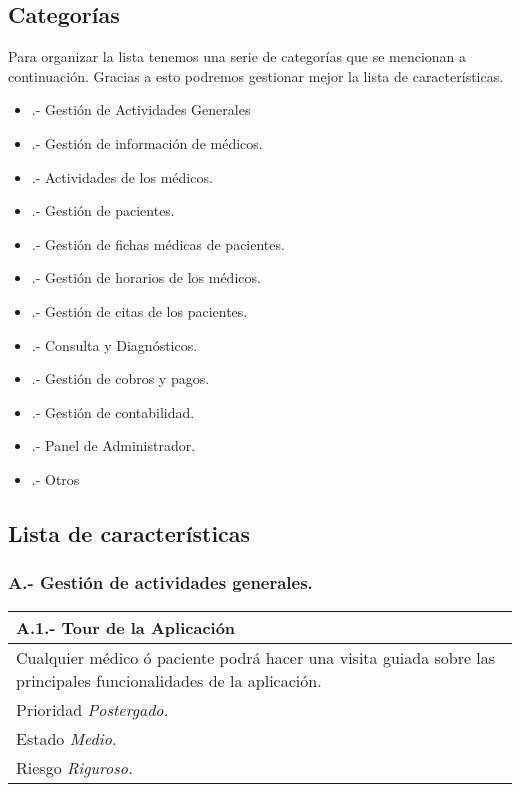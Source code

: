 	\subsection{Categorías}
	Para organizar la lista tenemos una serie de categorías que se mencionan a continuación. Gracias a esto podremos gestionar mejor la lista de características.
	\begin{itemize}
	\item [A].- Gestión de Actividades Generales 
	\item [B].- Gestión de información de médicos.
	\item [C].- Actividades de los médicos.
	\item [D].- Gestión de pacientes.
	\item [E].- Gestión de fichas médicas de pacientes.
	\item [F].- Gestión de horarios de los médicos.
	\item [G].- Gestión de citas de los pacientes.
	\item [H].- Consulta y Diagnósticos.
	\item [I].- Gestión de cobros y pagos.
	\item [J].- Gestión de contabilidad.
	\item [K].- Panel de Administrador.
	\item [L].- Otros
	\end{itemize}

	\subsection{Lista de características}

	\subsubsection{A.- Gestión de actividades generales.}

	\begin{center}
	\begin{tabulary}{15cm}{|L|}
		\hline
			\bf{A.1.- Tour de la Aplicación} \\
		\hline
			Cualquier médico ó paciente podrá hacer una visita guiada sobre las principales funcionalidades de la aplicación.\\
		\hline
			Prioridad \textit{Postergado.} \\
		\hline
			Estado \textit{Medio.} \\
		\hline
			Riesgo \textit{Riguroso.} \\
		\hline
	\end{tabulary}
	\end{center}

